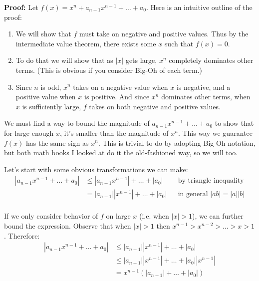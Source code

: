 \textbf{Proof:} Let $f(x)=x^{n}+a_{n-1}x^{n-1}+\ldots+a_{0}$. Here is an
intuitive outline of the proof:
\begin{enumerate}
\item We will show that $f$ must take on negative and positive values.
  Thus by the intermediate value theorem, there exists some $x$ such
  that $f(x)=0$.
\item To do that we will show that as $|x|$ gets large, $x^{n}$
  completely dominates other terms. (This is obvious if you consider
  Big-Oh of each term.)
\item Since $n$ is odd, $x^{n}$ takes on a negative value when $x$ is
  negative, and a positive value when $x$ is positive. And since
  $x^{n}$ dominates other terms, when $x$ is sufficiently large, $f$
  takes on both negative and positive values.
\end{enumerate}

We must find a way to bound the magnitude of
$a_{n-1}x^{n-1}+\ldots+a_{0}$ to show that for large enough $x$, it's
smaller than the magnitude of $x^n$. This way we guarantee $f(x)$ has
the same sign as $x^n$. This is trivial to do by adopting Big-Oh
notation, but both math books I looked at do it the old-fashioned way,
so we will too.

\vs

Let's start with some obvious transformations we can make:
\begin{align*}
  |a_{n-1}x^{n-1}+\ldots+a_{0}| &\leq |a_{n-1}x^{n-1}|+\ldots+|a_{0}| &&\text{by
                                                            triangle
                                                            inequality}\\
                           &=|a_{n-1}||x^{n-1}|+\ldots+|a_{0}|
                                                         &&\text{in
                                                            general } |ab|=|a||b|\\
\end{align*}

If we only consider behavior of $f$ on large $x$ (i.e. when $|x|>1$),
we can further bound the expression. Observe that when $|x|>1$ then
$x^{n-1}>x^{n-2}>\ldots>x>1$. Therefore:
\begin{align*}
  |a_{n-1}x^{n-1}+\ldots+a_{0}| &\leq |a_{n-1}||x^{n-1}|+\ldots+|a_{0}|\\
                           &\leq |a_{n-1}||x^{n-1}|+\ldots+|a_{0}||x^{n-1}|\\
                           &= x^{n-1}(|a_{n-1}|+\ldots+|a_0|)
\end{align*}

